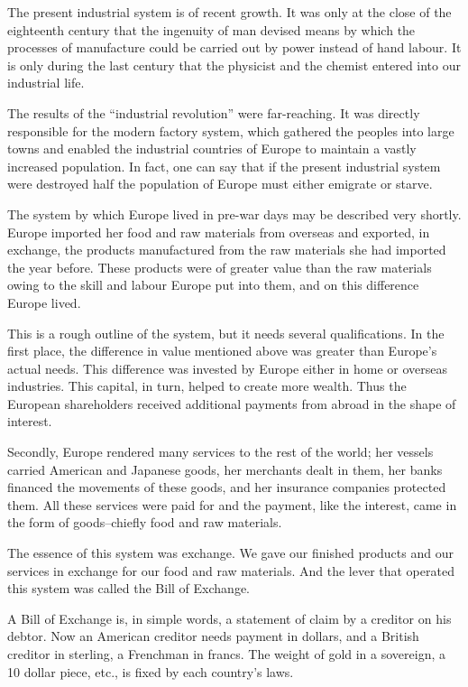 \documentclass{book}
\begin{document}
The present industrial system is of recent growth. It was only at the close of the eighteenth century that the ingenuity of man devised means by which the processes of manufacture could be carried out by power instead of hand labour. It is only during the last century that the physicist and the chemist entered into our industrial life.

The results of the “industrial revolution” were far-reaching. It was directly responsible for the modern factory system, which gathered the peoples into large towns and enabled the industrial countries of Europe to maintain a vastly increased population. In fact, one can say that if the present industrial system were destroyed half the population of Europe must either emigrate or starve.

The system by which Europe lived in pre-war days may be described very shortly. Europe imported her food and raw materials from overseas and exported, in exchange, the products manufactured from the raw materials she had imported the year before. These products were of greater value than the raw materials owing to the skill and labour Europe put into them, and on this difference Europe lived.

This is a rough outline of the system, but it needs several qualifications. In the first place, the difference in value mentioned above was greater than Europe’s actual needs. This difference was invested by Europe either in home or overseas industries. This capital, in turn, helped to create more wealth. Thus the European shareholders received additional payments from abroad in the shape of interest.

Secondly, Europe rendered many services to the rest of the world; her vessels carried American and Japanese goods, her merchants dealt in them, her banks financed the movements of these goods, and her insurance companies protected them. All these services were paid for and the payment, like the interest, came in the form of goods–chiefly food and raw materials.

The essence of this system was exchange. We gave our finished products and our services in exchange for our food and raw materials. And the lever that operated this system was called the Bill of Exchange.

A Bill of Exchange is, in simple words, a statement of claim by a creditor on his debtor. Now an American creditor needs payment in dollars, and a British creditor in sterling, a Frenchman in francs. The weight of gold in a sovereign, a 10 dollar piece, etc., is fixed by each country’s laws.
\end{document}
